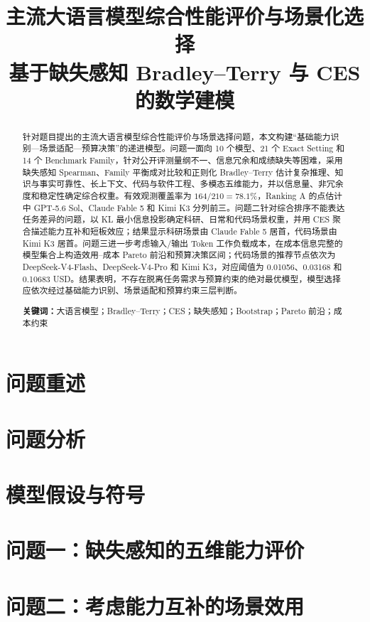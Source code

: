 \documentclass[UTF8,a4paper,11pt]{ctexart}
\title{\heiti 主流大语言模型综合性能评价与场景化选择\\基于缺失感知 Bradley--Terry 与 CES 的数学建模}
\author{}
\date{}
\begin{document}
\maketitle

\begin{abstract}
针对题目提出的主流大语言模型综合性能评价与场景选择问题，本文构建“基础能力识别—场景适配—预算决策”的递进模型。问题一面向 10 个模型、21 个 Exact Setting 和 14 个 Benchmark Family，针对公开评测量纲不一、信息冗余和成绩缺失等困难，采用缺失感知 Spearman、Family 平衡成对比较和正则化 Bradley--Terry 估计复杂推理、知识与事实可靠性、长上下文、代码与软件工程、多模态五维能力，并以信息量、非冗余度和稳定性确定综合权重。有效观测覆盖率为 $164/210=78.1\%$，Ranking A 的点估计中 GPT-5.6 Sol、Claude Fable 5 和 Kimi K3 分列前三。问题二针对综合排序不能表达任务差异的问题，以 KL 最小信息投影确定科研、日常和代码场景权重，并用 CES 聚合描述能力互补和短板效应；结果显示科研场景由 Claude Fable 5 居首，代码场景由 Kimi K3 居首。问题三进一步考虑输入/输出 Token 工作负载成本，在成本信息完整的模型集合上构造效用--成本 Pareto 前沿和预算决策区间；代码场景的推荐节点依次为 DeepSeek-V4-Flash、DeepSeek-V4-Pro 和 Kimi K3，对应阈值为 0.01056、0.03168 和 0.10683 USD。结果表明，不存在脱离任务需求与预算约束的绝对最优模型，模型选择应依次经过基础能力识别、场景适配和预算约束三层判断。

\noindent\textbf{关键词：}大语言模型；Bradley--Terry；CES；缺失感知；Bootstrap；Pareto 前沿；成本约束
\end{abstract}

\section{问题重述}


\section{问题分析}


\section{模型假设与符号}


\section{问题一：缺失感知的五维能力评价}


\section{问题二：考虑能力互补的场景效用}

\end{document}
